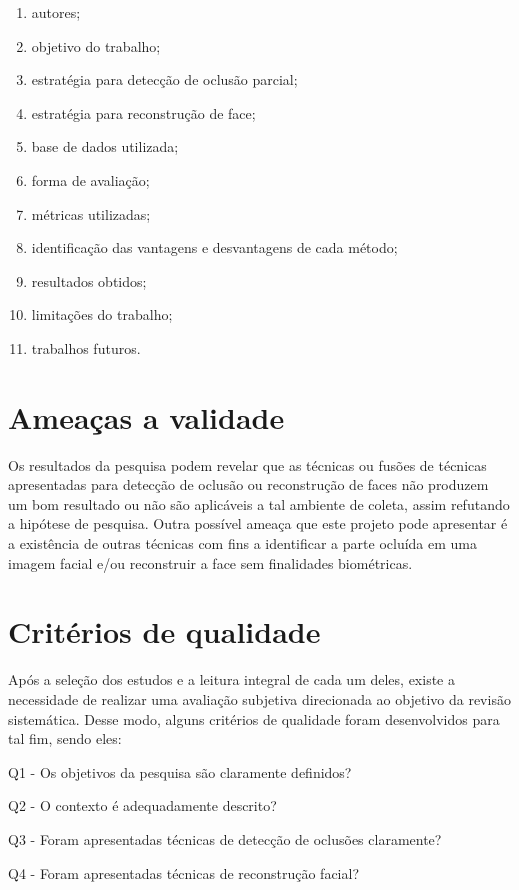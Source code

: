\begin{enumerate}
\item autores;
\item objetivo do trabalho;
\item estratégia para detecção de oclusão parcial;
\item estratégia para reconstrução de face;
\item base de dados utilizada;
\item forma de avaliação;
\item métricas utilizadas;
\item identificação das vantagens e desvantagens de cada método;
\item resultados obtidos;
\item limitações do trabalho;
\item trabalhos futuros.

\end{enumerate}


\section{Ameaças a validade}


Os resultados da pesquisa podem revelar que as técnicas ou fusões de técnicas apresentadas para detecção de oclusão ou reconstrução de faces não produzem um bom resultado ou não são aplicáveis a tal ambiente de coleta, assim refutando a hipótese de pesquisa. 
Outra possível ameaça que este projeto pode apresentar é a existência de outras técnicas com fins a identificar a parte ocluída em uma imagem facial e/ou reconstruir a face sem finalidades biométricas.


\section{Critérios de qualidade}
Após a seleção dos estudos e a leitura integral de cada um deles, existe a necessidade de realizar uma avaliação subjetiva direcionada ao objetivo da revisão sistemática. Desse modo, alguns critérios de qualidade foram desenvolvidos para tal fim, sendo eles:


Q1 -	Os objetivos da pesquisa são claramente definidos?

Q2 -	O contexto é adequadamente descrito?

Q3 - 	Foram apresentadas técnicas de detecção de oclusões claramente?

Q4 -	Foram apresentadas técnicas de reconstrução facial?

